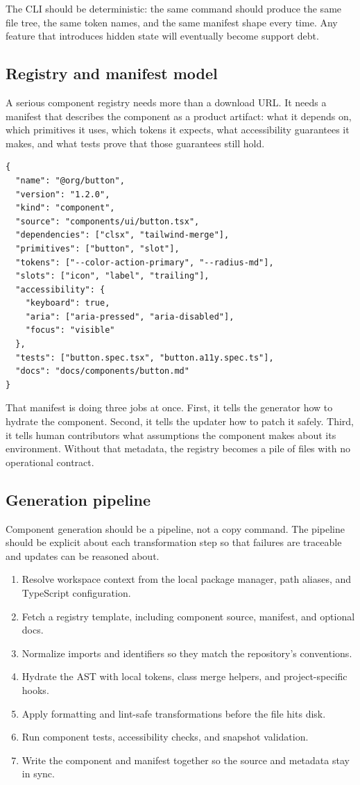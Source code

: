 \documentclass[11pt,twoside,a4paper]{article}
\begin{document}
The CLI should be deterministic: the same command should produce the same file tree, the same token names, and the same manifest shape every time. Any feature that introduces hidden state will eventually become support debt.

\subsection{Registry and manifest model}
A serious component registry needs more than a download URL. It needs a manifest that describes the component as a product artifact: what it depends on, which primitives it uses, which tokens it expects, what accessibility guarantees it makes, and what tests prove that those guarantees still hold.

\begin{verbatim}
{
  "name": "@org/button",
  "version": "1.2.0",
  "kind": "component",
  "source": "components/ui/button.tsx",
  "dependencies": ["clsx", "tailwind-merge"],
  "primitives": ["button", "slot"],
  "tokens": ["--color-action-primary", "--radius-md"],
  "slots": ["icon", "label", "trailing"],
  "accessibility": {
    "keyboard": true,
    "aria": ["aria-pressed", "aria-disabled"],
    "focus": "visible"
  },
  "tests": ["button.spec.tsx", "button.a11y.spec.ts"],
  "docs": "docs/components/button.md"
}
\end{verbatim}

That manifest is doing three jobs at once. First, it tells the generator how to hydrate the component. Second, it tells the updater how to patch it safely. Third, it tells human contributors what assumptions the component makes about its environment. Without that metadata, the registry becomes a pile of files with no operational contract.

\subsection{Generation pipeline}
Component generation should be a pipeline, not a copy command. The pipeline should be explicit about each transformation step so that failures are traceable and updates can be reasoned about.

\begin{enumerate}[leftmargin=*, itemsep=0.45em]
  \item Resolve workspace context from the local package manager, path aliases, and TypeScript configuration.
  \item Fetch a registry template, including component source, manifest, and optional docs.
  \item Normalize imports and identifiers so they match the repository's conventions.
  \item Hydrate the AST with local tokens, class merge helpers, and project-specific hooks.
  \item Apply formatting and lint-safe transformations before the file hits disk.
  \item Run component tests, accessibility checks, and snapshot validation.
  \item Write the component and manifest together so the source and metadata stay in sync.
\end{enumerate}
\end{document}
